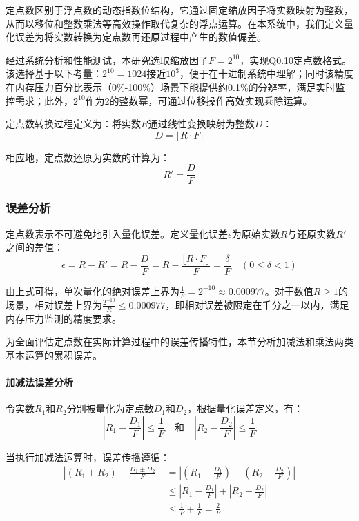 定点数区别于浮点数的动态指数位结构，它通过固定缩放因子将实数映射为整数，从而以移位和整数乘法等高效操作取代复杂的浮点运算。在本系统中，我们定义量化误差为将实数转换为定点数再还原过程中产生的数值偏差。

经过系统分析和性能测试，本研究选取缩放因子$F=2^{10}$，实现Q0.10定点数格式。该选择基于以下考量：$2^{10}=1024$接近$10^3$，便于在十进制系统中理解；同时该精度在内存压力百分比表示（0\%-100\%）场景下能提供约0.1\%的分辨率，满足实时监控需求；此外，$2^{10}$作为2的整数幂，可通过位移操作高效实现乘除运算。

定点数转换过程定义为：将实数$R$通过线性变换映射为整数$D$：
\begin{equation}
D = \lfloor R \cdot F \rfloor
\end{equation}

相应地，定点数还原为实数的计算为：
\begin{equation}
R' = \frac{D}{F}
\end{equation}

\subsubsection{误差分析}

定点数表示不可避免地引入量化误差。定义量化误差$\epsilon$为原始实数$R$与还原实数$R'$之间的差值：
\begin{equation}
\epsilon = R - R' = R - \frac{D}{F} = R - \frac{\lfloor R \cdot F \rfloor}{F} = \frac{\delta}{F} \quad (0 \leq \delta < 1)
\end{equation}

由上式可得，单次量化的绝对误差上界为$\frac{1}{F} = 2^{-10} \approx 0.000977$。对于数值$R \geq 1$的场景，相对误差上界为$\frac{2^{-10}}{R} \leq 0.000977$，即相对误差被限定在千分之一以内，满足内存压力监测的精度要求。

为全面评估定点数在实际计算过程中的误差传播特性，本节分析加减法和乘法两类基本运算的累积误差。

\paragraph{加减法误差分析}\quad 
令实数$R_1$和$R_2$分别被量化为定点数$D_1$和$D_2$，根据量化误差定义，有：
\begin{equation}
|R_1 - \frac{D_1}{F}| \leq \frac{1}{F} \quad \text{和} \quad |R_2 - \frac{D_2}{F}| \leq \frac{1}{F}
\end{equation}

当执行加减法运算时，误差传播遵循：
\begin{equation}
\begin{aligned}
|(R_1 \pm R_2) - \frac{D_1 \pm D_2}{F}| &= |(R_1 - \frac{D_1}{F}) \pm (R_2 - \frac{D_2}{F})| \\
&\leq |R_1 - \frac{D_1}{F}| + |R_2 - \frac{D_2}{F}| \\
&\leq \frac{1}{F} + \frac{1}{F} = \frac{2}{F}
\end{aligned}
\end{equation}

